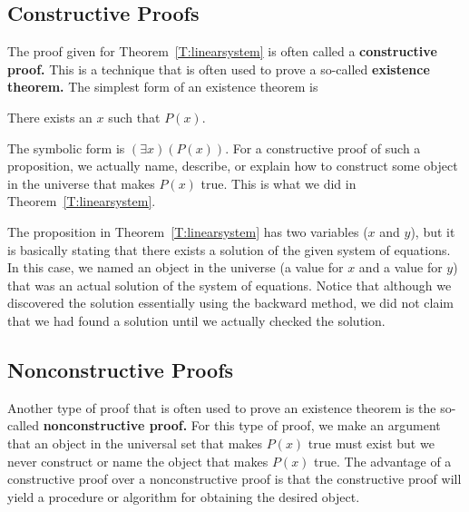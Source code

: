 \subsection*{Constructive Proofs}
The proof given for Theorem~\ref{T:linearsystem} is often called a \textbf{constructive proof.}
%
%
  This is a technique that is often used to prove a so-called \textbf{existence theorem.}
%
  The simplest form of an existence theorem is  
\begin{center}
There exists an $x$  such that  $P\left( x \right)$.
\end{center}
The symbolic form is  $\left( {\exists x} \right)\left( {P\left( x \right)} \right)$.  For a constructive proof of such a proposition, we actually name, describe, or explain how to construct  some object in the universe that makes  $P\left( x \right)$ true.  This is what we did in 
Theorem~\ref{T:linearsystem}.

The proposition in Theorem~\ref{T:linearsystem} has two variables ($x$ and $y$), but it is basically stating that there exists a solution of the given system of equations.  In this case, we named an object in the universe (a value for  $x$  and a value for  $y$)  that was an actual solution of the system of equations.  Notice that although we discovered the solution essentially using the backward method, we did not claim that we had found a solution until we actually checked the solution.

\subsection*{Nonconstructive Proofs}
Another type of proof that is often used to prove an existence theorem is the so-called \textbf{nonconstructive proof.}
%
%
  For this type of proof, we make an argument that an object  in the universal set that makes  
$P\left( x \right)$ true must exist but we never construct or name the object that makes  
$P\left( x \right)$  true.  The advantage of a constructive proof over a nonconstructive proof is that the constructive proof will yield a procedure or algorithm for obtaining the desired object.

